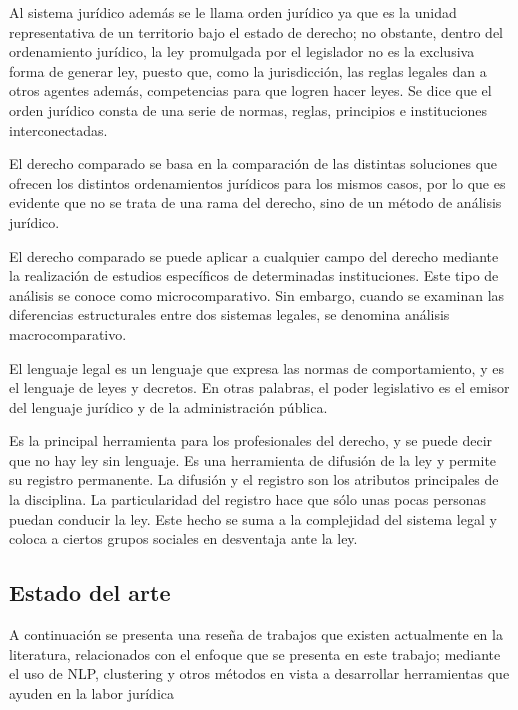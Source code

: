 \documentclass[12pt]{article}
\begin{document}
		
		
		Al sistema jurídico además se le llama orden jurídico ya que es la unidad representativa de un territorio bajo el estado de derecho; no obstante, dentro del ordenamiento jurídico, la ley promulgada por el legislador no es la exclusiva forma de generar ley, puesto que, como la jurisdicción, las reglas legales dan a otros agentes además, competencias para que logren hacer leyes. Se dice que el orden jurídico consta de una serie de normas, reglas, principios e instituciones interconectadas. \cite{Baron2009}
		
		
		El derecho comparado se basa en la comparación de las distintas soluciones que ofrecen los distintos ordenamientos jurídicos para los mismos casos, por lo que es evidente que no se trata de una rama del derecho, sino de un método de análisis jurídico.\cite{Somma2006}
		
		El derecho comparado se puede aplicar a cualquier campo del derecho mediante la realización de estudios específicos de determinadas instituciones. Este tipo de análisis se conoce como microcomparativo. Sin embargo, cuando se examinan las diferencias estructurales entre dos sistemas legales, se denomina análisis macrocomparativo.\cite{Velazco2016}
		
		
		El lenguaje legal es un lenguaje que expresa las normas de comportamiento, y es el lenguaje de leyes y decretos. En otras palabras, el poder legislativo es el emisor del lenguaje jurídico y de la administración pública.\cite{Toral2003}
				
		Es la principal herramienta para los profesionales del derecho, y se puede decir que no hay ley sin lenguaje. Es una herramienta de difusión de la ley y permite su registro permanente. La difusión y el registro son los atributos principales de la disciplina. La particularidad del registro hace que sólo unas pocas personas puedan conducir la ley. Este hecho se suma a la complejidad del sistema legal y coloca a ciertos grupos sociales en desventaja ante la ley. \cite{Albi2000}     
		
		
		\subsection{Estado del arte}
		A continuación se presenta una reseña de trabajos que existen actualmente en la literatura, relacionados con el enfoque que se presenta en este trabajo; mediante el uso de NLP, clustering y otros métodos en vista a desarrollar herramientas que ayuden en la labor jurídica
		
\end{document}
